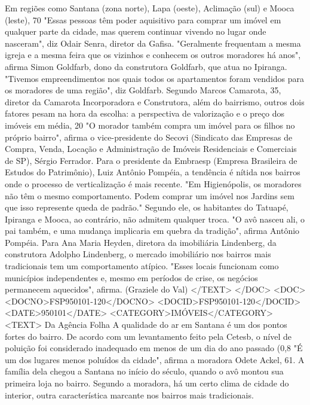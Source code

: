Em regiões como Santana (zona norte), Lapa (oeste), Aclimação (sul) e Mooca (leste), 70%
"Essas pessoas têm poder aquisitivo para comprar um imóvel em qualquer parte da cidade, mas querem continuar vivendo no lugar onde nasceram", diz Odair Senra, diretor da Gafisa.
"Geralmente frequentam a mesma igreja e a mesma feira que os vizinhos e conhecem os outros moradores há anos", afirma Simon Goldfarb, dono da construtora Goldfarb, que atua no Ipiranga.
"Tivemos empreendimentos nos quais todos os apartamentos foram vendidos para os moradores de uma região", diz Goldfarb.
Segundo Marcos Camarota, 35, diretor da Camarota Incorporadora e Construtora, além do bairrismo, outros dois fatores pesam na hora da escolha: a perspectiva de valorização e o preço dos imóveis em média, 20%
"O morador também compra um imóvel para os filhos no próprio bairro", afirma o vice-presidente do Secovi (Sindicato das Empresas de Compra, Venda, Locação e Administração de Imóveis Residenciais e Comerciais de SP), Sérgio Ferrador.
Para o presidente da Embraesp (Empresa Brasileira de Estudos do Patrimônio), Luiz Antônio Pompéia, a tendência é nítida nos bairros onde o processo de verticalização é mais recente.
"Em Higienópolis, os moradores não têm o mesmo comportamento. Podem comprar um imóvel nos Jardins sem que isso represente queda de padrão."
Segundo ele, os habitantes do Tatuapé, Ipiranga e Mooca, ao contrário, não admitem qualquer troca. "O avô nasceu ali, o pai também, e uma mudança implicaria em quebra da tradição", afirma Antônio Pompéia.
Para Ana Maria Heyden, diretora da imobiliária Lindenberg, da construtora Adolpho Lindenberg, o mercado imobiliário nos bairros mais tradicionais tem um comportamento atípico.
"Esses locais funcionam como municípios independentes e, mesmo em períodos de crise, os negócios permanecem aquecidos", afirma.
(Graziele do Val)
</TEXT>
</DOC>
<DOC>
<DOCNO>FSP950101-120</DOCNO>
<DOCID>FSP950101-120</DOCID>
<DATE>950101</DATE>
<CATEGORY>IMÓVEIS</CATEGORY>
<TEXT>
Da Agência Folha 
A qualidade do ar em Santana é um dos pontos fortes do bairro. De acordo com um levantamento feito pela Cetesb, o nível de poluição foi considerado inadequado em menos de um dia do ano passado (0,8%
"É um dos lugares menos poluídos da cidade", afirma a moradora Odete Ackel, 61. A família dela chegou a Santana no início do século, quando o avô montou sua primeira loja no bairro.
Segundo a moradora, há um certo clima de cidade do interior, outra característica marcante nos bairros mais tradicionais. 
